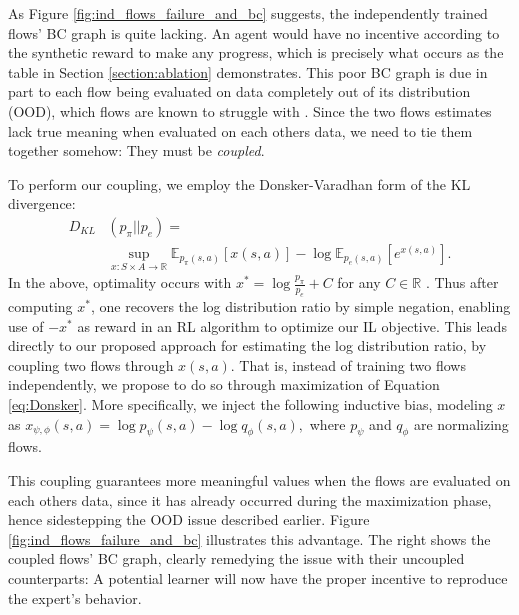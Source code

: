 As Figure \ref{fig:ind_flows_failure_and_bc} suggests, the independently trained flows' BC graph is quite lacking. An agent would have no incentive according to the synthetic reward to make any progress, which is precisely what occurs as the table in Section \ref{section:ablation} demonstrates. This poor BC graph is due in part to each flow being evaluated on data completely out of its distribution (OOD), which flows are known to struggle with \cite{kirichenko2020normalizing}. Since the two flows estimates lack true meaning when evaluated on each others data, we need to tie them together somehow: They must be \textit{coupled}.

To perform our coupling, we employ the Donsker-Varadhan \cite{donsker1976asymptotic} form of the KL divergence:
\begin{align}
D_{KL}&(p_\pi||p_{e}) =
\nonumber \\
&\sup_{x: S \times A \to \mathbb{R}} \mathbb{E}_{p_\pi(s,a)}\left[x(s,a)\right] - \log \mathbb{E}_{p_e(s,a)}\left[e^{x(s,a)} \right].\label{eq:Donsker}
\end{align}
In the above, optimality occurs with  $x^*= \log \frac{p_\pi}{p_e} + C$ for any $C\in \mathbb{R}$ \cite{kostrikov2019imitation, gangwani2020harnessing,belghazi2018mine}. Thus after computing $x^*$, one recovers the log distribution ratio by simple negation, enabling use of $-x^*$ as reward in an RL algorithm to optimize our IL objective. This leads directly to our proposed approach for estimating the log distribution ratio, by coupling two flows through $x(s,a)$. That is, instead of training two flows independently, we propose to do so through maximization of Equation \ref{eq:Donsker}. More specifically, we inject the following inductive bias, modeling $x$ as $x_{\psi,\phi}(s,a) = \log p_\psi(s,a) - \log q_\phi(s,a),$ where  $p_\psi$ and $q_\phi$ are normalizing flows. %


This coupling guarantees more meaningful values when the flows are evaluated on each others data, since it has already occurred during the maximization phase, hence sidestepping the OOD issue described earlier. Figure \ref{fig:ind_flows_failure_and_bc} illustrates this advantage. The right shows the coupled flows' BC graph, clearly remedying the issue with their uncoupled counterparts: A potential learner will now have the proper incentive to reproduce the expert's behavior. 


